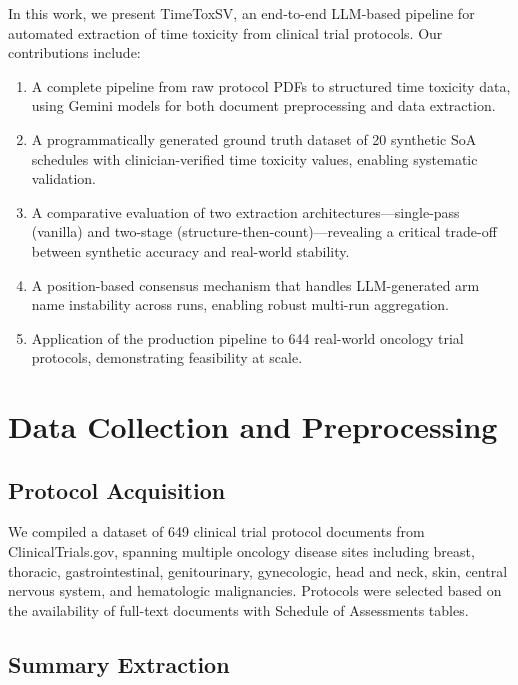 \documentclass[11pt]{article}
\begin{document}
In this work, we present TimeToxSV, an end-to-end LLM-based pipeline for automated extraction of time toxicity from clinical trial protocols. Our contributions include:

\begin{enumerate}[leftmargin=*]
    \item A complete pipeline from raw protocol PDFs to structured time toxicity data, using Gemini models for both document preprocessing and data extraction.
    \item A programmatically generated ground truth dataset of 20 synthetic SoA schedules with clinician-verified time toxicity values, enabling systematic validation.
    \item A comparative evaluation of two extraction architectures---single-pass (vanilla) and two-stage (structure-then-count)---revealing a critical trade-off between synthetic accuracy and real-world stability.
    \item A position-based consensus mechanism that handles LLM-generated arm name instability across runs, enabling robust multi-run aggregation.
    \item Application of the production pipeline to 644 real-world oncology trial protocols, demonstrating feasibility at scale.
\end{enumerate}

\section{Data Collection and Preprocessing}

\subsection{Protocol Acquisition}

We compiled a dataset of 649 clinical trial protocol documents from ClinicalTrials.gov, spanning multiple oncology disease sites including breast, thoracic, gastrointestinal, genitourinary, gynecologic, head and neck, skin, central nervous system, and hematologic malignancies. Protocols were selected based on the availability of full-text documents with Schedule of Assessments tables.

\subsection{Summary Extraction}
\end{document}
